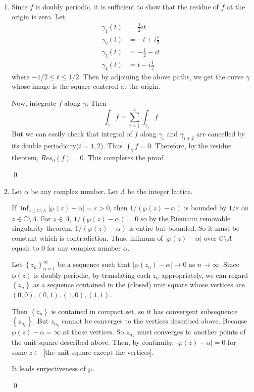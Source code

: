 \begin{problem}[10.4] \hfill
	\begin{enumerate}[label = (\alph*)]
		\item Since $f$ is doubly periodic, it is sufficient to show that the residue of $f$ at the origin is zero.
			Let
			\begin{align*}
				\gamma_1(t) & = \frac{1}{2} it \\
				\gamma_2(t) & = -t +i\frac{1}{2} \\
				\gamma_3(t) & = -\frac{1}{2} -it \\
				\gamma_4(t) & = t -i\frac{1}{2}
			\end{align*}
			where $-1/2 \leq t \leq 1/2$.
			Then by adjoining the above paths, we get the curve $\gamma$ whose image is the square centered at the origin.

			Now, integrate $f$ along $\gamma$. Then
			\[
				\int_\gamma f = \sum_{i=1}^4 \int_{\gamma_{i}} f
			\]
			But we can easily check that integral of $f$ along $\gamma_i$ and $\gamma_{i+2}$ are cancelled by its double periodicity($i = 1, 2$).
			Thus $\int_\gamma f = 0$.
			Therefore, by the residue theorem, $Res_0(f) = 0$.
			This completes the proof.

			\qed

		\item Let $\alpha$ be any complex number. Let $\Lambda$ be the integer lattice.

			If $\inf_{z \in \mathbb{C} \setminus \Lambda} |\wp(z)-\alpha | = \varepsilon > 0$,
			then $1/(\wp(z)-\alpha)$ is bounded by $1/\varepsilon$ on $z \in \mathbb{C} \setminus \Lambda$.
			For $z \in \Lambda$, $1/(\wp(z)-\alpha) = 0$ so by the Riemann removable singularity theorem, $1/(\wp(z) -\alpha)$ is entire but bounded.
			So it must be constant which is contradiction.
			Thus, infimum of $|\wp(z) -\alpha|$ over $\mathbb{C} \setminus \Lambda$ equals to $0$ for any complex number $\alpha$.

			Let $\left\{ z_n \right\}_{n=1}^{\infty}$ be a sequence such that $|\wp(z_n) -\alpha | \rightarrow 0$ as $n\rightarrow \infty$.
			Since $\wp(z)$ is doubly periodic, by translating each $z_n$ appropriately, we can regard $\left\{ z_n \right\}$ as a sequence contained in the (closed) unit square whose vertices are $(0, 0), (0, 1), (1, 0), (1, 1)$.

			Then $\left\{ z_n \right\}$ is contained in compact set, so it has convergent subsequence $\left\{ z_{n_k} \right\}$.
			But $z_{n_k}$ cannot be converges to the vertices described above. Because $\wp(z)-\alpha = \infty$ at those vertices.
			So $z_{n_k}$ must converges to another points of the unit square described above.
			Then, by continuity, $|\wp(z) -\alpha| = 0$ for some $z \in$ [the unit square except the vertices].

			It leads surjectiveness of $\wp$.

			\qed

	\end{enumerate}
	
\end{problem}

